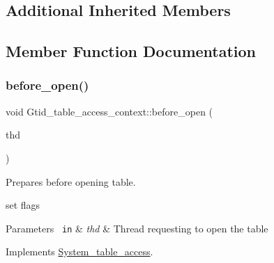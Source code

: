 \subsection*{Additional Inherited Members}


\subsection{Member Function Documentation}
\mbox{\label{classGtid__table__access__context_a2073456f19b6b9aa81cb7d874c4f2358}} 
\subsubsection{\texorpdfstring{before\+\_\+open()}{before\_open()}}
{\footnotesize\ttfamily void Gtid\+\_\+table\+\_\+access\+\_\+context\+::before\+\_\+open (\begin{DoxyParamCaption}\item[{T\+HD $\ast$}]{thd }\end{DoxyParamCaption})\hspace{0.3cm}{\ttfamily [virtual]}}

Prepares before opening table.
\begin{DoxyItemize}
\item set flags
\end{DoxyItemize}


\begin{DoxyParams}[1]{Parameters}
\mbox{\texttt{ in}}  & {\em thd} & Thread requesting to open the table \\
\hline
\end{DoxyParams}


Implements \mbox{\hyperlink{classSystem__table__access_a7357c29323649f270cf35b08cd8fe826}{System\+\_\+table\+\_\+access}}.

\mbox{\label{classGtid__table__access__context_ad61c84d1acef30f8de7620b7f60dfcfd}} 
